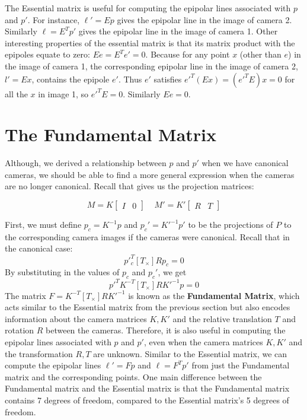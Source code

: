 \documentclass[a4paper, 12pt]{article}
\renewcommand\emph{\textbf}
\begin{document}
The Essential matrix is useful for computing the epipolar lines associated with $p$ and $p'$. For instance, $\ell' = Ep$ gives the epipolar line in the image of camera 2. Similarly $\ell = E^Tp'$ gives the epipolar line in the image of camera 1. Other interesting properties of the essential matrix is that its matrix product with the epipoles equate to zero: $Ee = E^Te' = 0$. 
Because for any point $x$ (other than $e$) in the image of camera 1, the corresponding epipolar line in the image of camera 2, $l'=Ex$, contains the epipole $e'$. Thus $e'$ satisfies $e'^T(Ex) = (e'^TE)x=0$ for all the $x$ in image 1, so $e'^TE=0$. Similarly $Ee=0$.


\section{The Fundamental Matrix}
Although, we derived a relationship between $p$ and $p'$ when we have canonical cameras, we should be able to find a more general expression when the cameras are no longer canonical. Recall that gives us the projection matrices:

\begin{equation}
    M = K\begin{bmatrix} I & 0\end{bmatrix} \ \ \ \ \ M' = K'\begin{bmatrix}R & T\end{bmatrix}
    \label{eq:projection_matrices2}
\end{equation}

First, we must define $p_c = K^{-1}p$ and $p_c' = K'^{-1}p'$ to be the projections of $P$ to the corresponding camera images if the cameras were canonical. Recall that in the canonical case:
\begin{equation}
    p'^T_c [T_\times]Rp_c = 0
    \label{eq:canonical_constraint}
\end{equation}
By substituting in the values of $p_c$ and $p_c'$, we get
\begin{equation}
    p'^TK^{-T} [T_\times]RK'^{-1}p = 0
    \label{eq:canonical_constraint_substitute}
\end{equation}
The matrix $F = K^{-T} [T_\times]RK'^{-1}$ is known as the \emph{Fundamental Matrix}, which acts similar to the Essential matrix from the previous section but also encodes information about the camera matrices $K, K'$ and the relative translation $T$ and rotation $R$ between the cameras. Therefore, it is also useful in computing the epipolar lines associated with $p$ and $p'$, even when the camera matrices $K, K'$ and the transformation $R,T$ are unknown. Similar to the Essential matrix, we can compute the epipolar lines $\ell' = Fp$ and $\ell = F^T p'$ from just the Fundamental matrix and the corresponding points. One main difference between the Fundamental matrix and the Essential matrix is that the Fundamental matrix contains 7 degrees of freedom, compared to the Essential matrix's 5 degrees of freedom.
\end{document}

